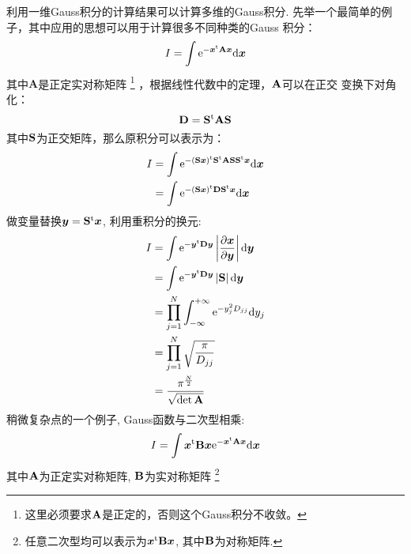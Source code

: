         利用一维Gauss积分的计算结果可以计算多维的Gauss积分. 
        先举一个最简单的例子，其中应用的思想可以用于计算很多不同种类的Gauss
        积分：
        \begin{equation}
            I = \int \mathrm{e}^{-\bm{x}^\mathrm{t}\mathbf{A}\bm{x}}\mathrm{d} \bm{x}
        \end{equation}
        其中$\bm{A}$是正定实对称矩阵
        \footnote{
            这里必须要求$\mathbf{A}$是正定的，否则这个Gauss积分不收敛。
        }
        ，根据线性代数中的定理，$\mathbf{A}$可以在正交
        变换下对角化：
        \begin{equation}
            \mathbf{D} = \mathbf{S}^{\mathrm{t}}\mathbf{AS}
        \end{equation}
        其中$\mathbf{S}$为正交矩阵，那么原积分可以表示为：
        \begin{equation}
            \begin{split}
                I &= \int\mathrm{e}^{-(\mathbf{S}\bm{x})^{\mathrm{t}}\mathbf{S}^{\mathrm{t}}\mathbf{AS}\mathbf{S}^{\mathrm{t}}\bm{x}}\mathrm{d} \bm{x}\\
                &= \int\mathrm{e}^{-(\mathbf{S}\bm{x})^{\mathrm{t}}\mathbf{D}\mathbf{S}^{\mathrm{t}}\bm{x}} \mathrm{d} \bm{x}
            \end{split}
        \end{equation}
        做变量替换$\bm{y} = \mathbf{S}^{\mathrm{t}}\bm{x}$, 利用重积分的换元:
        \begin{equation}
            \begin{split}
                I &= \int\mathrm{e}^{-\bm{y}^{\mathrm{t}}\mathbf{D}\bm{y}}\left|\frac{\partial{\bm{x}}}{\partial{\bm{y}}}\right|\mathrm{d} \bm{y}\\
                &= \int\mathrm{e}^{-\bm{y}^{\mathrm{t}}\mathbf{D}\bm{y}}\left|\mathbf{S}\right|\mathrm{d} \bm{y}\\
                &= \prod_{j=1}^{N}\int_{-\infty}^{+\infty}\mathrm{e}^{-y_j^2D_{jj}}\mathrm{d} y_j\\
                &= \prod_{j=1}^{N}\sqrt{\frac{\pi}{D_{jj}}}\\
                &= \frac{\pi^{\frac{N}{2}}}{\sqrt{\det{\mathbf{A}}}}
            \end{split}
        \end{equation}
        稍微复杂点的一个例子, Gauss函数与二次型相乘: 
        \begin{equation}
            I = \int \bm{x}^\mathrm{t}\mathbf{B}\bm{x} \mathrm{e}^{-\bm{x}^\mathrm{t}\mathbf{A}\bm{x}}\mathrm{d}\bm{x}
        \end{equation}
        其中$\mathbf{A}$为正定实对称矩阵, $\mathbf{B}$为实对称矩阵
        \footnote{
            任意二次型均可以表示为$\bm{x}^{\mathrm{t}}\mathbf{B}\bm{x}$, 其中$\mathbf{B}$为对称矩阵.
        }
